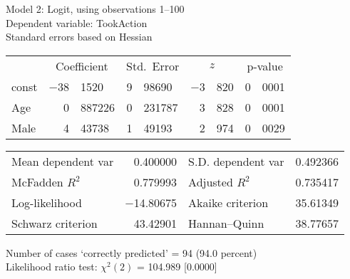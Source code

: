 \documentclass[11pt]{article}
\begin{document}
\thispagestyle{empty}

\begin{center}

Model 2: Logit, using observations 1--100\\
Dependent variable: TookAction\\
Standard errors based on Hessian

\vspace{1em}

\begin{tabular}{lr@{.}lr@{.}lr@{.}lr@{.}l}
  &
 \multicolumn{2}{c}{Coefficient} &
  \multicolumn{2}{c}{Std.\ Error} &
   \multicolumn{2}{c}{$z$} &
    \multicolumn{2}{c}{p-value} \\[1ex]
const &
  $-$38&1520 &
    9&98690 &
      $-$3&820 &
        0&0001 \\
Age &
  0&887226 &
    0&231787 &
      3&828 &
        0&0001 \\
Male &
  4&43738 &
    1&49193 &
      2&974 &
        0&0029 \\
\end{tabular}

\vspace{1ex}
\begin{tabular}{lrlr}
Mean dependent var &  0.400000 & S.D. dependent var &  0.492366 \\
McFadden $R^2$ &  0.779993 & Adjusted $R^2$ &  0.735417 \\
Log-likelihood & $-$14.80675 & Akaike criterion &  35.61349 \\
Schwarz criterion &  43.42901 & Hannan--Quinn &  38.77657 \\
\end{tabular}


\vspace{1ex}
\vspace{1em}
\begin{raggedright}
Number of cases `correctly predicted' = 94 (94.0 percent)\\
Likelihood ratio test: $\chi^2(2)$ = 104.989 [0.0000]\\
\end{raggedright}

\end{center}
\end{document}
